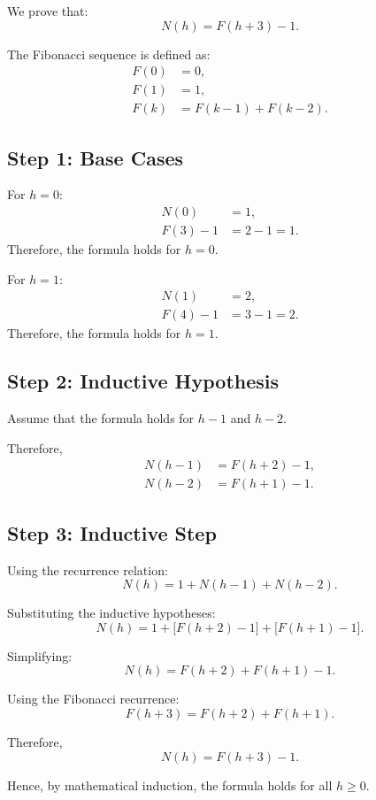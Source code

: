 \documentclass[11pt,a4paper]{article}
\begin{document}
We prove that:
\[
  N(h) = F(h+3) - 1.
\]

The Fibonacci sequence is defined as:
\begin{align*}
  F(0) &= 0,\\
  F(1) &= 1,\\
  F(k) &= F(k-1) + F(k-2).
\end{align*}

\subsection*{Step 1: Base Cases}

For $h = 0$:
\begin{align*}
  N(0) &= 1,\\
  F(3) - 1 &= 2 - 1 = 1.
\end{align*}
Therefore, the formula holds for $h = 0$.

For $h = 1$:
\begin{align*}
  N(1) &= 2,\\
  F(4) - 1 &= 3 - 1 = 2.
\end{align*}
Therefore, the formula holds for $h = 1$.

\subsection*{Step 2: Inductive Hypothesis}

Assume that the formula holds for $h-1$ and $h-2$.

Therefore,
\begin{align*}
  N(h-1) &= F(h+2) - 1,\\
  N(h-2) &= F(h+1) - 1.
\end{align*}

\subsection*{Step 3: Inductive Step}

Using the recurrence relation:
\[
  N(h) = 1 + N(h-1) + N(h-2).
\]

Substituting the inductive hypotheses:
\[
  N(h) = 1 + \bigl[F(h+2) - 1\bigr] + \bigl[F(h+1) - 1\bigr].
\]

Simplifying:
\[
  N(h) = F(h+2) + F(h+1) - 1.
\]

Using the Fibonacci recurrence:
\[
  F(h+3) = F(h+2) + F(h+1).
\]

Therefore,
\[
  \boxed{N(h) = F(h+3) - 1.}
\]

Hence, by mathematical induction, the formula holds for all $h \ge 0$.
\end{document}
